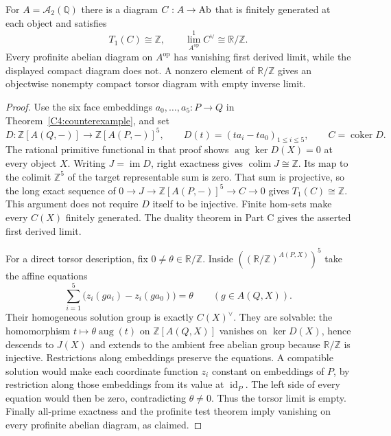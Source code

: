 \begin{corollary}
\label{C4:compact-obstruction}
For $A=\mathcal A_2(\mathbb Q)$ there is a diagram $C:A\to\mathrm{Ab}$
that is finitely generated at each object and satisfies
\[
 T_1(C)\cong\mathbb Z,
 \qquad
 \lim_{A^{\mathrm{op}}}^{1} C^\vee\cong\mathbb R/\mathbb Z.
\]
Every profinite abelian diagram on $A^{\mathrm{op}}$ has vanishing
first derived limit, while the displayed compact diagram does not.
A nonzero element of $\mathbb R/\mathbb Z$ gives an objectwise
nonempty compact torsor diagram with empty inverse limit.
\end{corollary}
\begin{proof}
Use the six face embeddings $a_0,\ldots,a_5:P\to Q$ in
Theorem~\ref{C4:counterexample}, and set
\[
 D:\mathbb Z[A(Q,-)]\longrightarrow\mathbb Z[A(P,-)]^5,
 \qquad D(t)=(ta_i-ta_0)_{1\leq i\leq5},
 \qquad C=\operatorname{coker}D.
\]
The rational primitive functional in that proof shows
$\operatorname{aug}\ker D(X)=0$ at every object $X$.
Writing $J=\operatorname{im}D$, right exactness gives
$\operatorname{colim}J\cong\mathbb Z$. Its map to the colimit
$\mathbb Z^5$ of the target representable sum is zero. That sum
is projective, so the long exact sequence of
$0\to J\to\mathbb Z[A(P,-)]^5\to C\to0$ gives
$T_1(C)\cong\mathbb Z$. This argument does not require $D$ itself
to be injective. Finite hom-sets make every $C(X)$ finitely generated.
The duality theorem in Part C gives the asserted first derived limit.

For a direct torsor description, fix $0\ne\theta\in\mathbb R/\mathbb Z$.
Inside
$((\mathbb R/\mathbb Z)^{A(P,X)})^5$ take the affine equations
\[
 \sum_{i=1}^5\bigl(z_i(ga_i)-z_i(ga_0)\bigr)=\theta
       \qquad(g\in A(Q,X)).
\]
Their homogeneous solution group is exactly $C(X)^\vee$.
They are solvable: the homomorphism
$t\mapsto\theta\operatorname{aug}(t)$ on
$\mathbb Z[A(Q,X)]$ vanishes on $\ker D(X)$, hence descends to
$J(X)$ and extends to the ambient free abelian group because
$\mathbb R/\mathbb Z$ is injective. Restrictions along embeddings
preserve the equations. A compatible solution would make each
coordinate function $z_i$ constant on embeddings of $P$, by
restriction along those embeddings from its value at $\operatorname{id}_P$.
The left side of every equation would then be zero, contradicting
$\theta\ne0$. Thus the torsor limit is empty. Finally all-prime
exactness and the profinite test theorem imply vanishing on every
profinite abelian diagram, as claimed.
\end{proof}
